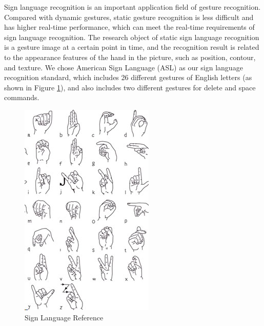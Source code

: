 \documentclass[10pt,twocolumn,letterpaper]{article}
\begin{document}
Sign language recognition is an important application field of gesture recognition. Compared with dynamic gestures, static gesture recognition is less difficult and has higher real-time performance, which can meet the real-time requirements of sign language recognition. The research object of static sign language recognition is a gesture image at a certain point in time, and the recognition result is related to the appearance features of the hand in the picture, such as position, contour, and texture. We chose American Sign Language (ASL) as our sign language recognition standard, which includes 26 different gestures of English letters (as shown in Figure \ref{fig:ref}), and also includes two different gestures for delete and space commands.

\begin{figure}[h]
\begin{center}
 \includegraphics[width=0.8\linewidth]{imgs/NIDCD-ASL-hands-2014.jpg}
\end{center}
\caption{Sign Language Reference}
\label{fig:ref}
\end{figure}
\end{document}
